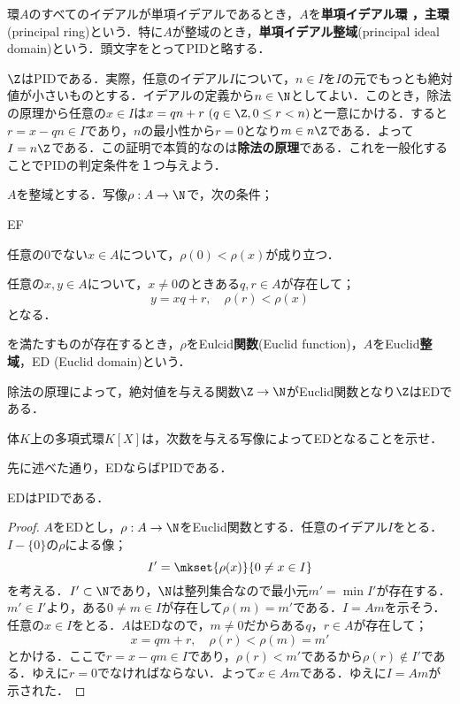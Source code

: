 \begin{defi}[PID]
	環$A$のすべてのイデアルが単項イデアルであるとき，$A$を\textbf{単項イデアル環
		，主環\footnotemark}(principal ring)という．特に$A$が整域のとき，\textbf{単項イデアル整域}(principal ideal domain)という．頭文字をとってPIDと略する．
\end{defi}

$\Z$はPIDである．実際，任意のイデアル$I$について，$n\in I$を$I$の元でもっとも絶対値が小さいものとする．イデアルの定義から$n\in\N$としてよい．このとき，除法の原理から任意の$x\in I$は$x=qn+r~(q\in\Z,0\leq r<n)$と一意にかける．すると$r=x-qn\in I$であり，$n$の最小性から$r=0$となり$m\in n\Z$である．よって$I=n\Z$である．この証明で本質的なのは\textbf{除法の原理}である．これを一般化することでPIDの判定条件を１つ与えよう．

\begin{defi}[Euclid整域]
	$A$を整域とする．写像$\rho:A\to\N$で，次の条件；
	\begin{defiterm}{EF}
		\item 任意の$0$でない$x\in A$について，$\rho(0)<\rho(x)$が成り立つ．
		\item 任意の$x,y\in A$について，$x\neq0$のときある$q,r\in A$が存在して；
		\[y=xq+r,\quad \rho(r)<\rho(x)\]
		となる．
	\end{defiterm}
	を満たすものが存在するとき，$\rho$をEulcid\textbf{関数}(Euclid function)，$A$をEuclid\textbf{整域}，ED (Euclid domain)という．
\end{defi}

除法の原理によって，絶対値を与える関数$\Z\to\N$がEuclid関数となり$\Z$はEDである．
\begin{exer}
	体$K$上の多項式環$K[X]$は，次数を与える写像によってEDとなることを示せ．	
\end{exer}

先に述べた通り，EDならばPIDである．
\begin{thm}
	EDはPIDである．
\end{thm}
\begin{proof}
	$A$をEDとし，$\rho:A\to\N$をEuclid関数とする．任意のイデアル$I$をとる．$I-\{0\}$の$\rho$による像；
	\[I'=\mkset{\rho(x)}{0\neq x\in I}\]
	を考える．$I'\subset\N$であり，$\N$は整列集合なので最小元$m'=\min I'$が存在する．$m'\in I'$より，ある$0\neq m\in I$が存在して$\rho(m)=m'$である．$I=Am$を示そう．任意の$x\in I$をとる．$A$はEDなので，$m\neq0$だからある$q，r\in A$が存在して；
	\[x=qm+r,\quad \rho(r)<\rho(m)=m'\]
	とかける．ここで$r=x-qm\in I$であり，$\rho(r)<m'$であるから$\rho(r)\not\in I'$である．ゆえに$r=0$でなければならない．よって$x\in Am$である．ゆえに$I=Am$が示された．
\end{proof}

